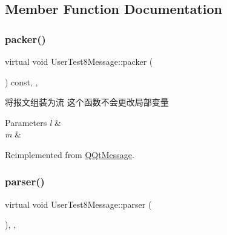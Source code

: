 \subsection{Member Function Documentation}
\mbox{\label{class_user_test8_message_adb7a902be87629d32761d5bd23a23d05}} 
\subsubsection{\texorpdfstring{packer()}{packer()}}
{\footnotesize\ttfamily virtual void User\+Test8\+Message\+::packer (\begin{DoxyParamCaption}\item[{Q\+Byte\+Array \&}]{ }\end{DoxyParamCaption}) const\hspace{0.3cm}{\ttfamily [inline]}, {\ttfamily [override]}, {\ttfamily [virtual]}}



将报文组装为流 这个函数不会更改局部变量 


\begin{DoxyParams}{Parameters}
{\em l} & \\
\hline
{\em m} & \\
\hline
\end{DoxyParams}


Reimplemented from \mbox{\hyperlink{class_q_qt_message_af1885c2c3628495808dca66ee8d72e14}{Q\+Qt\+Message}}.

\mbox{\label{class_user_test8_message_a5dbafc420f4b46bbaafc67541df709c4}} 
\subsubsection{\texorpdfstring{parser()}{parser()}}
{\footnotesize\ttfamily virtual void User\+Test8\+Message\+::parser (\begin{DoxyParamCaption}\item[{const Q\+Byte\+Array \&}]{ }\end{DoxyParamCaption})\hspace{0.3cm}{\ttfamily [inline]}, {\ttfamily [override]}, {\ttfamily [virtual]}}



